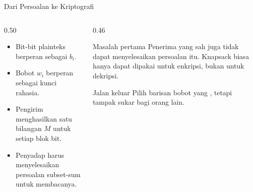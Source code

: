 \documentclass[aspectratio=169,11pt]{beamer}
\begin{document}
\begin{frame}{Dari Persoalan ke Kriptografi}
    \begin{columns}[T,onlytextwidth]
        \begin{column}{0.50\textwidth}
            \footnotesize
            \begin{itemize}
                \item Bit-bit plainteks berperan sebagai $b_i$.
                \item Bobot $w_i$ berperan sebagai kunci rahasia.
                \item Pengirim menghasilkan satu bilangan $M$ untuk setiap
                      blok bit.
                \item Penyadap harus menyelesaikan persoalan subset-sum untuk
                      membacanya.
            \end{itemize}
        \end{column}
        \begin{column}{0.46\textwidth}
            \begin{alertblock}{Masalah pertama}
                \footnotesize
                Penerima yang sah juga tidak dapat menyelesaikan persoalan itu.
                Knapsack biasa hanya dapat dipakai untuk enkripsi, bukan untuk
                dekripsi.
            \end{alertblock}
            \begin{block}{Jalan keluar}
                \footnotesize
                Pilih barisan bobot yang , tetapi tampak sukar bagi orang lain.
            \end{block}
        \end{column}
    \end{columns}
\end{frame}
\end{document}
